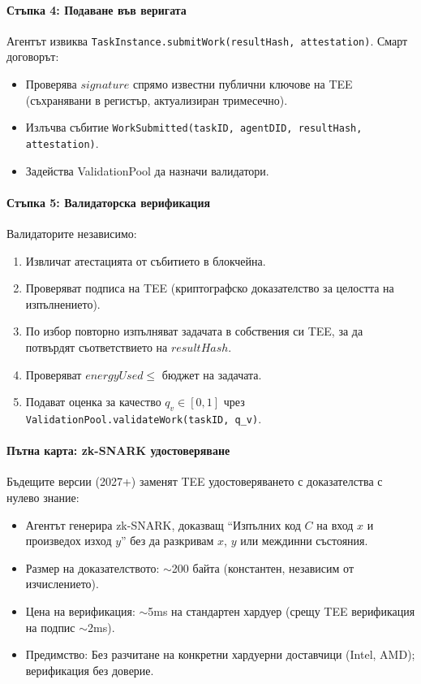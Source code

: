 \documentclass[11pt]{article}
\begin{document}
\paragraph{Стъпка 4: Подаване във веригата}
Агентът извиква \texttt{TaskInstance.submitWork(resultHash, attestation)}. Смарт договорът:
\begin{itemize}[noitemsep]
  \item Проверява $signature$ спрямо известни публични ключове на TEE (съхранявани в регистър, актуализиран тримесечно).
  \item Излъчва събитие \texttt{WorkSubmitted(taskID, agentDID, resultHash, attestation)}.
  \item Задейства ValidationPool да назначи валидатори.
\end{itemize}

\paragraph{Стъпка 5: Валидаторска верификация}
Валидаторите независимо:
\begin{enumerate}[noitemsep]
  \item Извличат атестацията от събитието в блокчейна.
  \item Проверяват подписа на TEE (криптографско доказателство за целостта на изпълнението).
  \item По избор повторно изпълняват задачата в собствения си TEE, за да потвърдят съответствието на $resultHash$.
  \item Проверяват $energyUsed \leq$ бюджет на задачата.
  \item Подават оценка за качество $q_v \in [0,1]$ чрез \texttt{ValidationPool.validateWork(taskID, q\_v)}.
\end{enumerate}

\paragraph{Пътна карта: zk-SNARK удостоверяване}
Бъдещите версии (2027+) заменят TEE удостоверяването с доказателства с нулево знание:
\begin{itemize}[noitemsep]
  \item Агентът генерира zk-SNARK, доказващ ``Изпълних код $C$ на вход $x$ и произведох изход $y$'' без да разкривам $x$, $y$ или междинни състояния.
  \item Размер на доказателството: $\sim$200 байта (константен, независим от изчислението).
  \item Цена на верификация: $\sim$5ms на стандартен хардуер (срещу TEE верификация на подпис $\sim$2ms).
  \item Предимство: Без разчитане на конкретни хардуерни доставчици (Intel, AMD); верификация без доверие.
\end{itemize}
\end{document}
